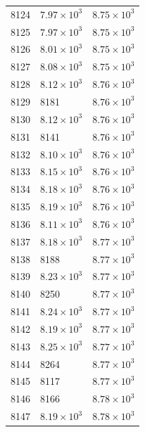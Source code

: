 \begin{table}[H]
\begin{tabular}{lll}
8124 & $\displaystyle 7.97 \times 10^{3}$ & $\displaystyle 8.75 \times 10^{3}$ \\
8125 & $\displaystyle 7.97 \times 10^{3}$ & $\displaystyle 8.75 \times 10^{3}$ \\
8126 & $\displaystyle 8.01 \times 10^{3}$ & $\displaystyle 8.75 \times 10^{3}$ \\
8127 & $\displaystyle 8.08 \times 10^{3}$ & $\displaystyle 8.75 \times 10^{3}$ \\
8128 & $\displaystyle 8.12 \times 10^{3}$ & $\displaystyle 8.76 \times 10^{3}$ \\
8129 & 8181 & $\displaystyle 8.76 \times 10^{3}$ \\
8130 & $\displaystyle 8.12 \times 10^{3}$ & $\displaystyle 8.76 \times 10^{3}$ \\
8131 & 8141 & $\displaystyle 8.76 \times 10^{3}$ \\
8132 & $\displaystyle 8.10 \times 10^{3}$ & $\displaystyle 8.76 \times 10^{3}$ \\
8133 & $\displaystyle 8.15 \times 10^{3}$ & $\displaystyle 8.76 \times 10^{3}$ \\
8134 & $\displaystyle 8.18 \times 10^{3}$ & $\displaystyle 8.76 \times 10^{3}$ \\
8135 & $\displaystyle 8.19 \times 10^{3}$ & $\displaystyle 8.76 \times 10^{3}$ \\
8136 & $\displaystyle 8.11 \times 10^{3}$ & $\displaystyle 8.76 \times 10^{3}$ \\
8137 & $\displaystyle 8.18 \times 10^{3}$ & $\displaystyle 8.77 \times 10^{3}$ \\
8138 & 8188 & $\displaystyle 8.77 \times 10^{3}$ \\
8139 & $\displaystyle 8.23 \times 10^{3}$ & $\displaystyle 8.77 \times 10^{3}$ \\
8140 & 8250 & $\displaystyle 8.77 \times 10^{3}$ \\
8141 & $\displaystyle 8.24 \times 10^{3}$ & $\displaystyle 8.77 \times 10^{3}$ \\
8142 & $\displaystyle 8.19 \times 10^{3}$ & $\displaystyle 8.77 \times 10^{3}$ \\
8143 & $\displaystyle 8.25 \times 10^{3}$ & $\displaystyle 8.77 \times 10^{3}$ \\
8144 & 8264 & $\displaystyle 8.77 \times 10^{3}$ \\
8145 & 8117 & $\displaystyle 8.77 \times 10^{3}$ \\
8146 & 8166 & $\displaystyle 8.78 \times 10^{3}$ \\
8147 & $\displaystyle 8.19 \times 10^{3}$ & $\displaystyle 8.78 \times 10^{3}$ \\

\end{tabular}
\end{table}
